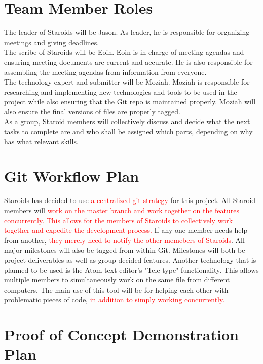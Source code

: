 \documentclass{article}
\begin{document}
\section{Team Member Roles}
The leader of Staroids will be Jason. As leader, he is responsible for organizing meetings and giving deadlines.\\
The scribe of Staroids will be Eoin. Eoin is in charge of meeting agendas and ensuring meeting documents are current and accurate. He is also responsible for assembling the meeting agendas from information from everyone.\\
The technology expert and submitter will be Moziah. Moziah is responsible for researching and implementing new technologies and tools to be used in the project while also ensuring that the Git repo is maintained properly. Moziah will also ensure the final versions of files are properly tagged.\\
As a group, Staroid members will collectively discuss and decide what the next tasks to complete are and who shall be assigned which parts, depending on why has what relevant skills.

\section{Git Workflow Plan}
Staroids has decided to use \textcolor{red}{a centralized git strategy} for this project. All Staroid members will \textcolor{red}{work on the master branch and work together on the features concurrently. This allows for the members of Staroids to collectively work together and expedite the development process.} If any one member needs help from another, \textcolor{red}{they merely need to notify the other memebers of Staroids}. \sout{All major milestones will also be tagged from within Git.} Milestones will both be project deliverables as well as group decided features. Another technology that is planned to be used is the Atom text editor's "Tele-type" functionality. This allows multiple members to simultaneously work on the same file from different computers. The main use of this tool will be for helping each other with problematic pieces of code, \textcolor{red}{in addition to simply working concurrently.}\\

\section{Proof of Concept Demonstration Plan}
\end{document}
